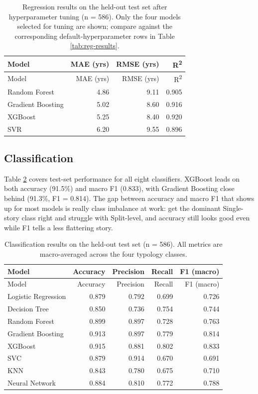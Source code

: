 \documentclass[11pt,a4paper]{article}
\begin{document}
\begin{longtable}[]{@{}lrrr@{}}
\caption{\label{tab:reg-tuned}Regression results on the held-out test
set after hyperparameter tuning (n = 586). Only the four models selected
for tuning are shown; compare against the corresponding
default-hyperparameter rows in Table
\ref{tab:reg-results}.}\tabularnewline
\toprule\noalign{}
Model & MAE (yrs) & RMSE (yrs) & R\textsuperscript{2} \\
\midrule\noalign{}
\endfirsthead
\toprule\noalign{}
Model & MAE (yrs) & RMSE (yrs) & R\textsuperscript{2} \\
\midrule\noalign{}
\endhead
\bottomrule\noalign{}
\endlastfoot
Random Forest & 4.86 & 9.11 & 0.905 \\
Gradient Boosting & 5.02 & 8.60 & 0.916 \\
XGBoost & 5.25 & 8.40 & 0.920 \\
SVR & 6.20 & 9.55 & 0.896 \\
\end{longtable}

\subsection{Classification}\label{classification}

Table \ref{tab:clf-results} covers test-set performance for all eight
classifiers. XGBoost leads on both accuracy (91.5\%) and macro F1
(0.833), with Gradient Boosting close behind (91.3\%, F1 = 0.814). The
gap between accuracy and macro F1 that shows up for most models is
really class imbalance at work: get the dominant Single-story class
right and struggle with Split-level, and accuracy still looks good even
while F1 tells a less flattering story.

\begin{longtable}[]{@{}lrrrr@{}}
\caption{\label{tab:clf-results}Classification results on the held-out
test set (n = 586). All metrics are macro-averaged across the four
typology classes.}\tabularnewline
\toprule\noalign{}
Model & Accuracy & Precision & Recall & F1 (macro) \\
\midrule\noalign{}
\endfirsthead
\toprule\noalign{}
Model & Accuracy & Precision & Recall & F1 (macro) \\
\midrule\noalign{}
\endhead
\bottomrule\noalign{}
\endlastfoot
Logistic Regression & 0.879 & 0.792 & 0.699 & 0.726 \\
Decision Tree & 0.850 & 0.736 & 0.754 & 0.744 \\
Random Forest & 0.899 & 0.897 & 0.728 & 0.763 \\
Gradient Boosting & 0.913 & 0.897 & 0.779 & 0.814 \\
XGBoost & 0.915 & 0.881 & 0.802 & 0.833 \\
SVC & 0.879 & 0.914 & 0.670 & 0.691 \\
KNN & 0.843 & 0.780 & 0.675 & 0.710 \\
Neural Network & 0.884 & 0.810 & 0.772 & 0.788 \\
\end{longtable}
\end{document}
